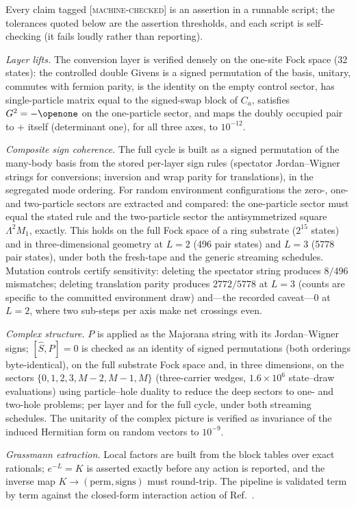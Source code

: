 \documentclass[aps,prd,twocolumn,superscriptaddress,nofootinbib,floatfix]{revtex4-2}
\newcommand{\evM}{\textnormal{\textsc{[machine-checked]}}}
\begin{document}
Every claim tagged \evM{} is an assertion in a runnable script; the
tolerances quoted below are the assertion thresholds, and each script is
self-checking (it fails loudly rather than reporting).

\emph{Layer lifts.} The conversion layer is verified densely on the
one-site Fock space (32 states): the controlled double Givens is a signed
permutation of the basis, unitary, commutes with fermion parity, is the
identity on the empty control sector, has single-particle matrix equal to
the signed-swap block of $C_a$, satisfies $G^2=-\openone$ on the
one-particle sector, and maps the doubly occupied pair to $+$ itself
(determinant one), for all three axes, to $10^{-12}$.

\emph{Composite sign coherence.} The full cycle is built as a signed
permutation of the many-body basis from the stored per-layer sign rules
(spectator Jordan--Wigner strings for conversions; inversion and wrap
parity for translations), in the segregated mode ordering. For random
environment configurations the zero-, one- and two-particle sectors are
extracted and compared: the one-particle sector must equal the stated rule
and the two-particle sector the antisymmetrized square $\Lambda^2M_1$,
exactly. This holds on the full Fock space of a ring substrate ($2^{15}$
states) and in three-dimensional geometry at $L=2$ (496 pair states) and
$L=3$ (5778 pair states), under both the fresh-tape and the generic
streaming schedules. Mutation controls certify sensitivity: deleting
the spectator string produces $8/496$ mismatches; deleting translation
parity produces $2772/5778$ at $L=3$ (counts are specific to the
committed environment draw) and---the recorded caveat---$0$ at
$L=2$, where two sub-steps per axis make net crossings even.

\emph{Complex structure.} $P$ is applied as the Majorana string with its
Jordan--Wigner signs; $[\hat S,P]=0$ is checked as an identity of signed
permutations (both orderings byte-identical), on the full substrate Fock
space and, in three dimensions, on the sectors
$\{0,1,2,3,M-2,M-1,M\}$ (three-carrier wedges, $1.6\times10^6$
state--draw evaluations) using particle--hole duality to reduce the deep sectors to one-
and two-hole problems; per layer and for the full cycle, under both
streaming schedules.
The unitarity of the complex picture is verified as invariance of the
induced Hermitian form on random vectors to $10^{-9}$.

\emph{Grassmann extraction.} Local factors are built from the block tables
over exact rationals; $e^{-L}=K$ is asserted exactly before any action is
reported, and the inverse map $K\to(\text{perm},\text{signs})$ must
round-trip. The pipeline is validated term by term against the closed-form
interaction action of Ref.~\cite{Wetterich2022b}.
\end{document}

